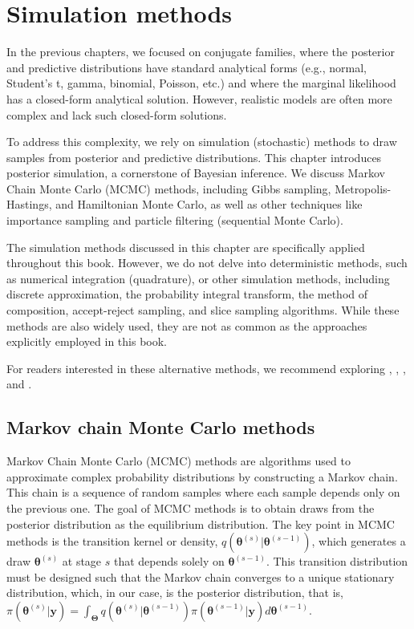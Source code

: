 \chapter{Simulation methods}\label{chap5}

In the previous chapters, we focused on conjugate families, where the posterior and predictive distributions have standard analytical forms (e.g., normal, Student's t, gamma, binomial, Poisson, etc.) and where the marginal likelihood has a closed-form analytical solution. However, realistic models are often more complex and lack such closed-form solutions.

To address this complexity, we rely on simulation (stochastic) methods to draw samples from posterior and predictive distributions. This chapter introduces posterior simulation, a cornerstone of Bayesian inference. We discuss Markov Chain Monte Carlo (MCMC) methods, including Gibbs sampling, Metropolis-Hastings, and Hamiltonian Monte Carlo, as well as other techniques like importance sampling and particle filtering (sequential Monte Carlo).

The simulation methods discussed in this chapter are specifically applied throughout this book. However, we do not delve into deterministic methods, such as numerical integration (quadrature), or other simulation methods, including discrete approximation, the probability integral transform, the method of composition, accept-reject sampling, and slice sampling algorithms. While these methods are also widely used, they are not as common as the approaches explicitly employed in this book.

For readers interested in these alternative methods, we recommend exploring \cite[Chaps.~2 and 3]{robert2010introducing}, \cite[Chaps.~2, 3, and 8]{robert2011monte}, \cite[Chap.~5]{greenberg2012introduction}, and \cite[Chap.~10]{gelman2021bayesian}.

\section{Markov chain Monte Carlo methods}\label{sec51}

Markov Chain Monte Carlo (MCMC) methods are algorithms used to approximate complex probability distributions by constructing a Markov chain. This chain is a sequence of random samples where each sample depends only on the previous one. The goal of MCMC methods is to obtain draws from the posterior distribution as the equilibrium distribution. The key point in MCMC methods is the transition kernel or density, $q(\bm{\theta}^{(s)}|\bm{\theta}^{(s-1)})$, which generates a draw $\bm{\theta}^{(s)}$ at stage $s$ that depends solely on $\bm{\theta}^{(s-1)}$. This transition distribution must be designed such that the Markov chain converges to a unique stationary distribution, which, in our case, is the posterior distribution, that is, $\pi(\bm{\theta}^{(s)}|\bm{y})=\int_{\bm{\Theta}}q(\bm{\theta}^{(s)}|\bm{\theta}^{(s-1)})\pi(\bm{\theta}^{(s-1)}|\bm{y})d\bm{\theta}^{(s-1)}$.

